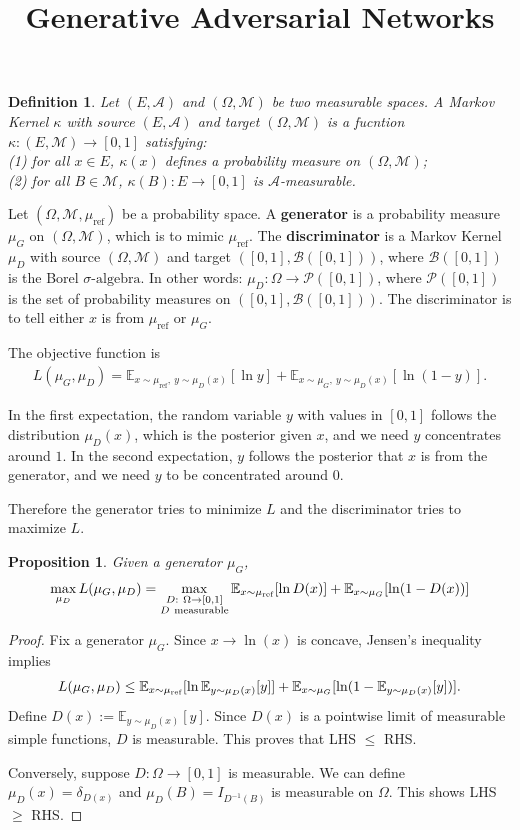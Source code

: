 \documentclass[12pt,oneside]{article}
\title{Generative Adversarial Networks}
\date{} %
\newcommand{\ra}[0]{\rightarrow}
\newcommand{\CM}[0]{\mathcal{M}}
\newcommand{\CA}[0]{\mathcal{A}}
\newcommand{\CP}[0]{\mathcal{P}}
\newcommand{\sa}[0]{\sigma \mbox{-algebra}}
\newcommand{\CB}[0]{\mathcal{B}}
\newcommand{\BE}[0]{\mathbb{E}}
\newcommand{\tn}[1]{\text{\normalfont #1}}
\newcommand{\ali}[1]{\begin{align*}#1\end{align*}}
\theoremstyle{plain}
\newtheorem*{prop}{Proposition}
\newtheorem*{defn}{Definition}
\theoremstyle{remark}
\begin{document}
\onehalfspace

\sloppy
\maketitle

\begin{defn}
Let $(E, \CA)$ and $(\Omega, \CM)$ be two measurable spaces. A Markov Kernel $\kappa$ with source $(E, \CA)$ and target $(\Omega, \CM)$ is a fucntion $\kappa: (E, \CM) \ra [0, 1]$ satisfying:\\
(1) for all $x \in E$, $\kappa(x)$ defines a probability measure on $(\Omega, \CM)$;\\
(2) for all $B \in \CM$, $\kappa(B): E \ra [0, 1]$ is $\CA$-measurable.
\end{defn}


Let $(\Omega, \CM, \mu_{\text{ref}})$ be a probability space. A {\bf generator} is a probability measure $\mu_G$ on $(\Omega, \CM)$, which is to mimic $\mu_{\text{ref}}$. The {\bf discriminator} is a Markov Kernel $\mu_D$ with source $(\Omega, \CM)$ and target $([0, 1], \CB([0, 1]))$, where $\CB([0, 1])$ is the Borel $\sa$. In other words: $\mu_D: \Omega \ra \CP([0, 1])$, where $\CP([0, 1])$ is the set of probability measures on $([0, 1], \CB([0, 1]))$. The discriminator is to tell either $x$ is from $\mu_{\text{ref}}$ or $\mu_G$.

The objective function is
\ali{L(\mu_G, \mu_D) = \BE_{x \sim \mu_{\text{ref}}, \ y \sim \mu_D(x)} [\ln y] + \BE_{x \sim \mu_G, \ y \sim \mu_D(x)} [\ln(1-y)].}

In the first expectation, the random variable $y$ with values in $[0, 1]$ follows the distribution $\mu_D(x)$, which is the posterior given $x$, and we need $y$ concentrates around $1$. In the second expectation, $y$ follows the posterior that $x$ is from the generator, and we need $y$ to be concentrated around $0$.

Therefore the generator tries to minimize $L$ and the discriminator tries to maximize $L$.

\begin{prop}
Given a generator $\mu_G$, 
\ali{\max_{\mu_D} L(\mu_G, \mu_D) = \max_{\substack{D: \ \Omega \ra [0,1] \\ D \ \tn{measurable}}} \BE_{x \sim \mu_\tn{ref}} [\ln D(x)] + \BE_{x \sim \mu_G} [\ln(1-D(x))]}
\end{prop}
\begin{proof}
Fix a generator $\mu_G$. Since $x \ra \ln(x)$ is concave, Jensen's inequality implies 
\ali{
    L(\mu_G, \mu_D) \leq \BE_{x \sim \mu_\tn{ref}} [\ln \BE_{y \sim \mu_D(x)} [y]] + \BE_{x \sim \mu_G} [\ln(1 - \BE_{y \sim \mu_D(x)}[y])].
}
Define $D(x) := \BE_{y \sim \mu_D(x)} [y]$. Since $D(x)$ is a pointwise limit of measurable simple functions, $D$ is measurable. This proves that LHS $\leq$ RHS.

Conversely, suppose $D:\Omega \ra [0,1]$ is measurable. We can define $\mu_D(x) = \delta_{D(x)}$ and $\mu_D(B) = I_{D^{-1}(B)}$ is measurable on $\Omega$. This shows LHS $\geq$ RHS.
\end{proof}
\end{document}

